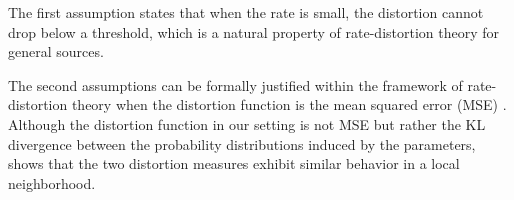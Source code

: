 \documentclass[11pt]{article}
\theoremstyle{plain}
\theoremstyle{definition}
\newcommand{\jian}[1]{{\it \color{red}{Jian: #1}}}
\newcommand{\zhixuan}[1]{{\it \color{blue}{zhixuan: #1}}}
\begin{document}


The first assumption states that when the rate is small, the distortion cannot drop below a threshold, which is a natural property of rate-distortion theory for general sources.

The second assumptions can be formally justified within the framework of rate-distortion theory when the distortion function is the mean squared error (MSE) \citep{cover2006elements}. Although the distortion function in our setting is not MSE but rather the KL divergence between the probability distributions induced by the parameters,  shows that the two distortion measures exhibit similar behavior in a local neighborhood.
\end{document}
